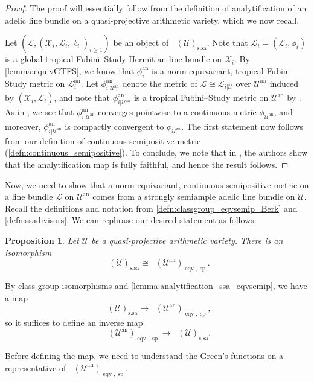 \documentclass[11pt,reqno]{amsart}
\newcommand{\cX}{\mathcal{X}}
\newcommand{\cU}{\mathcal{U}}
\newcommand{\cL}{\mathcal{L}}
\theoremstyle{theorem}
\numberwithin{equation}{subsection}
\newtheorem{prop}[subsubsection]{Proposition}
\numberwithin{equation}{subsection}
\theoremstyle{definition}
\theoremstyle{remark}
\numberwithin{equation}{subsubsection} \numberwithin{figure}{section}
\DeclareMathOperator{\an}{an}
\DeclareMathOperator{\acPic}{\widehat{\underline{Pic}}}
\DeclareMathOperator{\aCaCl}{\widehat{CaCl}}
\renewcommand{\geq}{\geqslant}
\DeclareMathOperator{\semip}{sp}
\DeclareMathOperator{\eqv}{eqv}
\DeclareMathOperator{\ssa}{s.sa}
\begin{document}
\begin{proof}
The proof will essentially follow from the definition of analytification of an adelic line bundle on a quasi-projective arithmetic variety, which we now recall.


Let $(\cL,(\cX_i,\overline{\cL}_i,\ell_i)_{i\geq 1})$ be an object of $\acPic(\cU)_{\ssa}$. 
Note that $\overline{\cL}_i = (\cL_i,\phi_i)$ is a global tropical Fubini--Study Hermitian line bundle on $\cX_i$. 
By \autoref{lemma:equivGTFS}, we know that $\phi_i^{\an}$ is a norm-equivariant, tropical Fubini--Study metric on $\cL_i^{\an}$. 
Let $\phi_{i|\cU^{\an}}^{\an}$ denote the metric of $\cL \cong \cL_{i|\cU}$ over $\cU^{\an}$ induced by $(\cX_i,\overline{\cL}_i)$, and note that $\phi^{\an}_{i|\cU^{\an}}$ is a tropical Fubini--Study metric on $\cU^{\an}$ by \cite[Proposition 2.14.(6)]{PilleSchneider:Global}. 
As in \cite[Proof of Proposition 3.4.1:~quasi-projective case]{YuanZhang:AdelicLineBundles}, we see that $\phi^{\an}_{i|\cU^{\an}}$ converges pointwise to a continuous metric $\phi_{\cU^{\an}}$, and moreover, $\phi^{\an}_{i|\cU^{\an}}$ is compactly convergent to $\phi_{\cU^{\an}}$. 
The first statement now follows from our definition of continuous semipositive metric (\autoref{defn:continuous_semipositive}). To conclude, we note that in \cite[Proof of Proposition 3.4.1:~quasi-projective case]{YuanZhang:AdelicLineBundles}, the authors show that the analytification map is fully faithful, and hence the result follows.
\end{proof}

Now, we need to show that a norm-equivariant, continuous semipositive metric on a line bundle $\cL$ on $\cU^{\an}$ comes from a strongly semiample adelic line bundle on $\cU$. 
Recall the definitions and notation from \autoref{defn:classgroup_eqvsemip_Berk} and \autoref{defn:ssadivisors}. 
We can rephrase our desired statement as follows:


\begin{prop}\label{prop:isom_ssadivisor_semipositive}
Let $\cU$ be a quasi-projective arithmetic variety. There is an isomorphism
\[
\aCaCl(\cU)_{\ssa} \cong \aCaCl(\cU^{\an})_{\eqv,\semip}. 
\]
\end{prop}

By class group isomorphisms and \autoref{lemma:analytification_ssa_eqvsemip}, we have a map
\[
\aCaCl(\cU)_{\ssa} \to \aCaCl(\cU^{\an})_{\eqv,\semip},
\]
so it suffices to define an inverse map
\[
\aCaCl(\cU^{\an})_{\eqv,\semip} \to \aCaCl(\cU)_{\ssa}. 
\]

Before defining the map, we need to understand the Green's functions on a representative of $\aCaCl(\cU^{\an})_{\eqv,\semip}$. 
\end{document}
